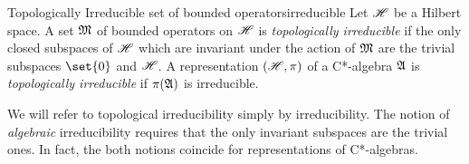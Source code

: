 \begin{definition}{Topologically Irreducible set of bounded operators}{irreducible}
    Let \(\mathscr{H}\) be a Hilbert space. A set \(\mathfrak{M}\) of bounded operators on \(\mathscr{H}\) is \emph{topologically irreducible} if the only closed subspaces of \(\mathscr{H}\) which are invariant under the action of \(\mathfrak{M}\) are the trivial subspaces \(\set{0}\) and \(\mathscr{H}\). A representation \((\mathscr{H}, \pi)\) of a C*-algebra \(\mathfrak{A}\) is \emph{topologically irreducible} if \(\pi(\mathfrak{A})\) is irreducible.
\end{definition}
\begin{remark}
    We will refer to topological irreducibility simply by irreducibility. The notion of \emph{algebraic} irreducibility requires that the only invariant subspaces are the trivial ones. 
    In fact, the both notions coincide for representations of C*-algebras.
\end{remark}

